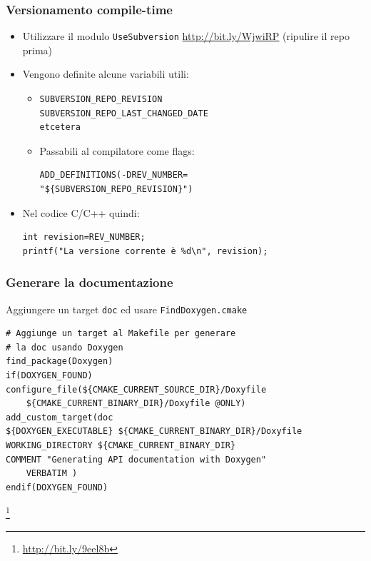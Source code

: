 \documentclass[10pt] {beamer}
\begin{document}
\begin{frame}[fragile]
 \frametitle{Versionamento compile-time}
\begin{itemize}
 \item Utilizzare il modulo \texttt{UseSubversion} \url{http://bit.ly/WjwiRP} (ripulire il repo prima)
\item Vengono definite alcune variabili utili:
\begin{itemize}
\item 

\begin{small}
\begin{verbatim}
SUBVERSION_REPO_REVISION
SUBVERSION_REPO_LAST_CHANGED_DATE
etcetera
\end{verbatim}
\end{small}
\item Passabili al compilatore come flags:
\begin{small}
\begin{verbatim}
ADD_DEFINITIONS(-DREV_NUMBER=
"${SUBVERSION_REPO_REVISION}")
\end{verbatim}
\end{small}
\end{itemize}
\item Nel codice C/C++ quindi:
\begin{verbatim}
int revision=REV_NUMBER;
printf("La versione corrente è %d\n", revision);
\end{verbatim}
\end{itemize}
\end{frame}

\begin{frame}[fragile]
 \frametitle{Generare la documentazione}
Aggiungere un target \texttt{doc} ed usare \texttt{FindDoxygen.cmake}
\begin{footnotesize}
\begin{verbatim}
# Aggiunge un target al Makefile per generare 
# la doc usando Doxygen
find_package(Doxygen)
if(DOXYGEN_FOUND)
configure_file(${CMAKE_CURRENT_SOURCE_DIR}/Doxyfile 
    ${CMAKE_CURRENT_BINARY_DIR}/Doxyfile @ONLY)
add_custom_target(doc
${DOXYGEN_EXECUTABLE} ${CMAKE_CURRENT_BINARY_DIR}/Doxyfile
WORKING_DIRECTORY ${CMAKE_CURRENT_BINARY_DIR}
COMMENT "Generating API documentation with Doxygen" 
    VERBATIM )
endif(DOXYGEN_FOUND)
\end{verbatim}
\end{footnotesize}
\footnote{\url{http://bit.ly/9eel8b}}
\end{frame}
\end{document}
